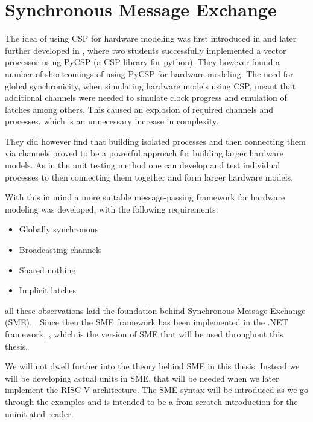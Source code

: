 \section{Synchronous Message Exchange}
    The idea of using CSP for hardware modeling was first introduced in \citet{BPUSimulator2013} and later further developed in \cite{PyCSPFPGA}, where two students successfully implemented a vector processor using PyCSP (a CSP library for python). They however found a number of shortcomings of using PyCSP for hardware modeling. The need for global synchronicity, when simulating hardware models using CSP, meant that additional channels were needed to simulate clock progress and emulation of latches among others. This caused an explosion of required channels and processes, which is an unnecessary increase in complexity.
    
    They did however find that building isolated processes and then connecting them via channels proved to be a powerful approach for building larger hardware models. As in the unit testing method one can develop and test individual processes to then connecting them together and form larger hardware models.
    
    With this in mind a more suitable message-passing framework for hardware modeling was developed, with the following requirements:
    
    \begin{itemize}
        \item Globally synchronous
        \item Broadcasting channels
        \item Shared nothing
        \item Implicit latches
    \end{itemize} 
    
    all these observations laid the foundation behind Synchronous Message Exchange (SME),  \citet{vinter2014synchronous}. 
    Since then the SME framework has been implemented in the .NET framework, \citet{skovhede2016building}, which is the version of SME that will be used throughout this thesis.
    
    We will not dwell further into the theory behind SME in this thesis. Instead we will be developing actual units in SME, that will be needed when we later implement the RISC-V architecture. The SME syntax will be introduced as we go through the examples and is intended to be a from-scratch introduction for the uninitiated reader. 
    

